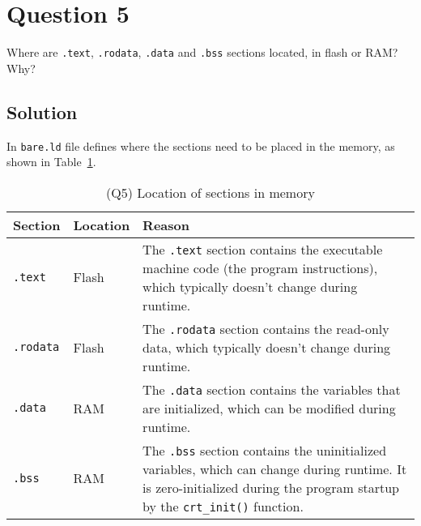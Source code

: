 \section*{Question 5}

Where are \texttt{.text}, \texttt{.rodata}, \texttt{.data} and \texttt{.bss} sections located, in flash or RAM?\@
Why?

\subsection*{Solution}

In \texttt{bare.ld} file defines where the sections need to be placed in the memory, as shown in Table~\ref{tab:sections}.
\begin{table}[h]
    \centering
    \begin{tabular}{p{2cm} p{2cm} p{10cm}} \toprule
        \textbf{Section}  &
        \textbf{Location} &
        \textbf{Reason}
        \\ \midrule
        \texttt{.text}    &
        Flash             &
        The \texttt{.text} section contains the executable machine code (the program instructions), which typically doesn't change during runtime.
        \\
        \texttt{.rodata}  &
        Flash             &
        The \texttt{.rodata} section contains the read-only data, which typically doesn't change during runtime.
        \\
        \texttt{.data}    &
        RAM               &
        The \texttt{.data} section contains the variables that are initialized, which can be modified during runtime.
        \\
        \texttt{.bss}     &
        RAM               &
        The \texttt{.bss} section contains the uninitialized variables, which can change during runtime.
        It is zero-initialized during the program startup by the \texttt{crt\_init\@()} function.
        \\ \bottomrule
    \end{tabular}
    \caption{
        (Q5) Location of sections in memory
    }\label{tab:sections}
\end{table}
